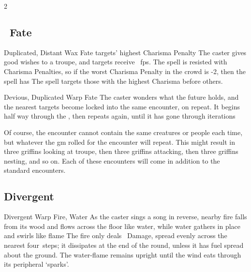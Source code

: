 \begin{multicols}{2}

\subsection[Fate]{~Fate}
\label{fateSpells}

\setcounter{diceNo}{1}


  {Duplicated, Distant}%
  {Wax}%
  {Fate}%
  {targets' highest Charisma Penalty}%
  {The caster gives good wishes to a troupe, and  targets receive \showDam~\glspl{fp}.
  The \gls{spell} is resisted with Charisma Penalties, so if the worst Charisma Penalty in the crowd is -2, then the \gls{spell} has \tn[9]}%
  {The spell targets those with the highest Charisma before others.}


  {Devious, Duplicated}%
  {Warp}%
  {Fate}%
  {}%
  {The caster wonders what the future holds, and the nearest  targets become locked into the same encounter, on repeat.
  It begins half way through the \showOnset, then repeats again, until it has gone through  iterations}%
  {\par
  Of course, the encounter cannot contain the same creatures or people each time, but whatever the \gls{gm} rolled for the encounter will repeat.
  This might result in three \glspl{griffin} looking at troupe, then three \glspl{griffin} attacking, then three \glspl{griffin} nesting, and so on.
  Each of these encounters will come in addition to the standard encounters.}


\subsection{Divergent}
\label{divergentSpells}

  {Divergent}%
  {Warp}%
  {Fire, Water}%
  {}%
  {As the caster sings a song in reverse, nearby fire falls from its wood and flows across the floor like water, while water gathers in place and swirls like flame}%
  {
  The fire only deals \showDam~Damage, spread evenly across the nearest four~\glspl{step}; it dissipates at the end of the \gls{round}, unless it has fuel spread about the ground.
  The water-flame remains upright until the wind eats through its peripheral `sparks'.
  }


\end{multicols}
